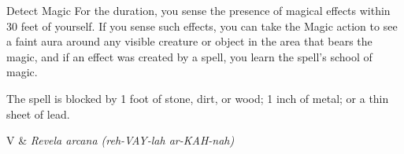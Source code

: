 \begin{Spell}[
  tags={Concentration, Ritual},
  level=1st,
  time=1 Action,
  range=Self (30 ft.),
  components={V, S},
  duration=10 Minutes,
  school=Divination,
  attack=None,
  effect=Detection
]{Detect Magic}
For the duration, you sense the presence of magical effects within 30 feet of yourself. If you sense such effects, you can take the Magic action to see a faint aura around any visible creature or object in the area that bears the magic, and if an effect was created by a spell, you learn the spell's school of magic.

The spell is blocked by 1 foot of stone, dirt, or wood; 1 inch of metal; or a thin sheet of lead.

\begin{components}
V & \textit{Revela arcana (reh-VAY-lah ar-KAH-nah)}
\end{components}
\end{Spell}


